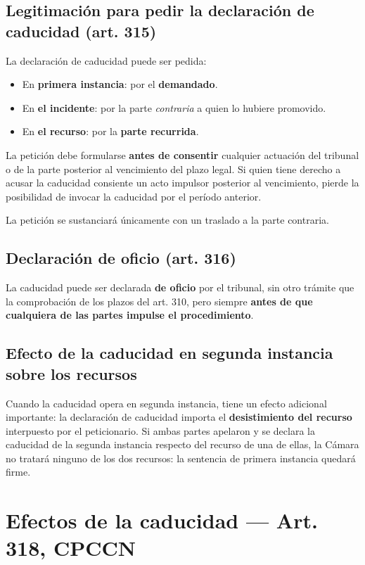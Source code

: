 \documentclass[12pt,oneside]{book}
\begin{document}
\subsection{Legitimación para pedir la declaración de caducidad (art. 315)}

La declaración de caducidad puede ser pedida:

\begin{itemize}
    \item En \textbf{primera instancia}: por el \textbf{demandado}.
    \item En \textbf{el incidente}: por la parte \emph{contraria} a quien lo hubiere promovido.
    \item En \textbf{el recurso}: por la \textbf{parte recurrida}.
\end{itemize}

La petición debe formularse \textbf{antes de consentir} cualquier actuación del tribunal o de la parte posterior al vencimiento del plazo legal. Si quien tiene derecho a acusar la caducidad consiente un acto impulsor posterior al vencimiento, pierde la posibilidad de invocar la caducidad por el período anterior.

La petición se sustanciará únicamente con un traslado a la parte contraria.

\subsection{Declaración de oficio (art. 316)}

La caducidad puede ser declarada \textbf{de oficio} por el tribunal, sin otro trámite que la comprobación de los plazos del art. 310, pero siempre \textbf{antes de que cualquiera de las partes impulse el procedimiento}.

\subsection{Efecto de la caducidad en segunda instancia sobre los recursos}

Cuando la caducidad opera en segunda instancia, tiene un efecto adicional importante: la declaración de caducidad importa el \textbf{desistimiento del recurso} interpuesto por el peticionario. Si ambas partes apelaron y se declara la caducidad de la segunda instancia respecto del recurso de una de ellas, la Cámara no tratará ninguno de los dos recursos: la sentencia de primera instancia quedará firme.

\section{Efectos de la caducidad --- Art. 318, CPCCN}
\end{document}
